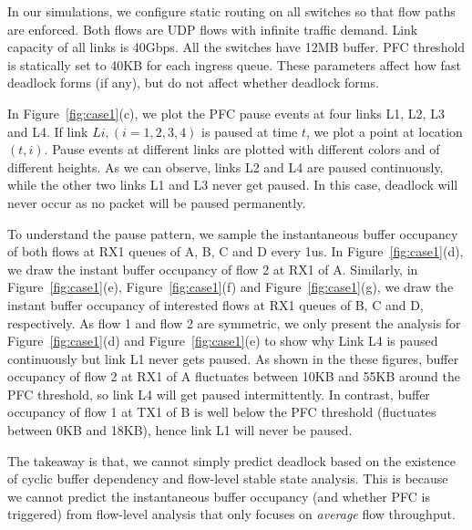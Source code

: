 In our simulations, we configure static routing on all switches so that flow paths are enforced. 
Both flows are UDP flows with infinite traffic demand. Link capacity of 
all links is 40Gbps. All the switches have 12MB buffer. PFC threshold is statically set to 40KB for 
each ingress queue. These parameters affect how fast deadlock forms (if any), but do not affect whether deadlock forms.

In Figure~\ref{fig:case1}(c), we plot the PFC pause events at four links L1, L2, L3 and L4. 
If link $Li, (i=1,2,3,4)$ is paused at time $t$, we plot a point at location $(t, i)$. Pause events at 
different links are plotted with different colors and of different heights. As we can observe, links 
L2 and L4 are paused continuously, while the other two links L1 and L3 never get paused. In this case, 
deadlock will never occur as no packet will be paused permanently.

To understand the pause pattern, we sample the instantaneous buffer occupancy of 
both flows at RX1 queues of A, B, C and D every 1us. In Figure~\ref{fig:case1}(d), we draw the instant 
buffer occupancy of flow 2 at RX1 of A. 
Similarly, in Figure~\ref{fig:case1}(e), Figure~\ref{fig:case1}(f) and Figure~\ref{fig:case1}(g), we draw 
the instant buffer occupancy of interested flows at RX1 queues of B, C and D, respectively. As 
flow 1 and flow 2 are symmetric, we only present the analysis for Figure~\ref{fig:case1}(d) and 
Figure~\ref{fig:case1}(e) to show why Link L4 is paused continuously but link L1 never gets paused.
As shown in the these figures, buffer occupancy of flow 2 at RX1 of A fluctuates between 10KB 
and 55KB around the PFC threshold, so link L4 will get paused intermittently. In contrast, buffer 
occupancy of flow 1 at TX1 of B is well below the PFC threshold (fluctuates between 0KB and 18KB), 
hence link L1 will never be paused. 

The takeaway is that, we cannot simply predict deadlock based on the existence of cyclic buffer dependency
and flow-level stable state analysis. This is because we cannot predict 
the instantaneous buffer occupancy (and whether PFC is triggered) from flow-level analysis that only 
focuses on {\em average} flow throughput.

